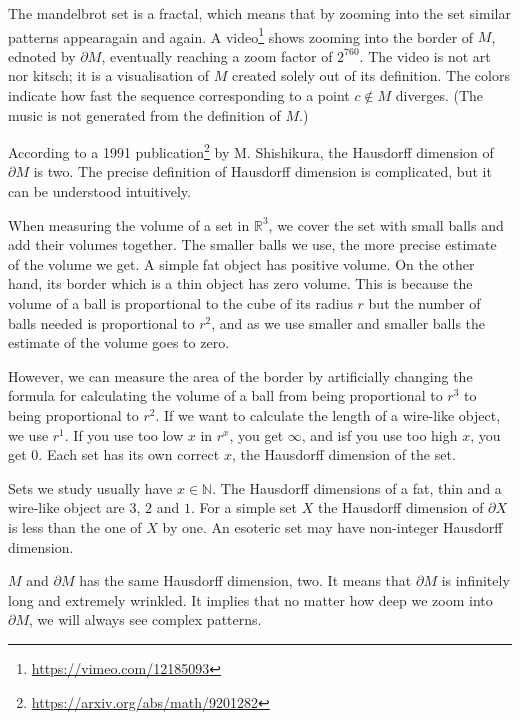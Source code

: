 \documentclass[11pt,oneside,%
]{memoir}
\theoremstyle{definition}
\newcommand{\NN}{\mathbb{N}}
\newcommand{\RR}{\mathbb{R}}
\begin{document}
The mandelbrot set is a fractal, which means that by zooming into the set similar patterns appearagain and again. A video\footnote{\url{https://vimeo.com/12185093}} shows zooming into the border of \(M\), ednoted by \(\partial M\), eventually reaching a zoom factor of \(2^{760}\). The video is not art nor kitsch; it is a visualisation of \(M\) created solely out of its definition. The colors indicate how fast the sequence corresponding to a point \(c\notin M\) diverges. (The music is not generated from the definition of \(M\).)

According to a 1991 publication\footnote{\url{https://arxiv.org/abs/math/9201282}} by M. Shishikura, the Hausdorff dimension of \(\partial M\) is two. The precise definition of Hausdorff dimension is complicated, but it can be understood intuitively.

When measuring the volume of a set in \(\RR^3\), we cover the set with small balls and add their volumes together. The smaller balls we use, the more precise estimate of the volume we get. A simple fat object has positive volume. On the other hand, its border which is a thin object has zero volume. This is because the volume of a ball is proportional to the cube of its radius \(r\) but the number of balls needed is proportional to \(r^2\), and as we use smaller and smaller balls the estimate of the volume goes to zero.

However, we can measure the area of the border by artificially changing the formula for calculating the volume of a ball from being proportional to \(r^3\) to being proportional to \(r^2\). If we want to calculate the length of a wire-like object, we use \(r^1\). If you use too low \(x\) in \(r^x\), you get \(\infty\), and isf you use too high \(x\), you get \(0\). Each set has its own correct \(x\), the Hausdorff dimension of the set.

Sets we study usually have \(x\in\NN\). The Hausdorff dimensions of a fat, thin and a wire-like object are \(3\), \(2\) and \(1\). For a simple set \(X\) the Hausdorff dimension of \(\partial X\) is less than the one of \(X\) by one. An esoteric set may have non-integer Hausdorff dimension. 

\(M\) and \(\partial M\) has the same Hausdorff dimension, two. It means that \(\partial M\) is infinitely long and extremely wrinkled. It implies that no matter how deep we zoom into \(\partial M\), we will always see complex patterns.
\end{document}
